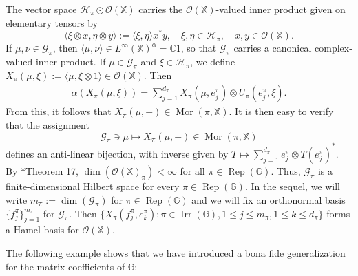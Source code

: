 \documentclass[reqno]{amsart}
\numberwithin{equation}{section}
\DeclareMathOperator{\Rep}{\mathrm{Rep}}
\DeclareMathOperator{\Irr}{\mathrm{Irr}}
\newcommand{\Mor}{\operatorname{Mor}}
\newcommand{\mcG}{\mathcal{G}}
\newcommand{\mcH}{\mathcal{H}}
\newcommand{\mcO}{\mathcal{O}}
\newcommand{\C}{\mathbb{C}}
\newcommand{\G}{\mathbb{G}}
\newcommand{\X}{\mathbb{X}}
\begin{document}
The vector space $\mcH_\pi \odot \mcO(\X)$ carries the $\mcO(\X)$-valued inner product given on elementary tensors by
$$\langle \xi \otimes x, \eta \otimes y\rangle := \langle \xi, \eta\rangle x^* y, \quad \xi, \eta \in \mcH_\pi, \quad x,y \in \mcO(\X).$$
If $\mu, \nu \in \mcG_\pi$, then $\langle \mu, \nu\rangle \in L^\infty(\X)^\alpha = \C1$, so that $\mcG_\pi$ carries a canonical complex-valued inner product. If $\mu \in \mcG_\pi$ and $\xi \in \mcH_\pi$, we define
$X_\pi(\mu, \xi):= \langle \mu, \xi \otimes 1\rangle \in \mcO(\X).$ Then
\begin{align}\label{actionmatrixcoeff}
    \alpha(X_\pi(\mu, \xi)) = \sum_{j=1}^{d_\pi} X_\pi(\mu, e_j^\pi)\otimes U_\pi(e_j^\pi, \xi).
\end{align}
From this, it follows that
$X_\pi(\mu, -)\in \Mor(\pi, \X)$.
It is then easy to verify that the assignment
$$\mcG_\pi \ni \mu\mapsto X_\pi(\mu,-)\in \Mor(\pi, \X)$$
defines an anti-linear bijection, with inverse given by $T \mapsto \sum_{j=1}^{d_\pi} e_j^\pi \otimes T(e_j^\pi)^*$. By \cite{Boc95}*{Theorem 17}, $\dim(\mcO(\X)_\pi)< \infty$ for all $\pi \in \Rep(\G)$. Thus, $\mcG_\pi$ is a finite-dimensional Hilbert space for every $\pi\in \Rep(\G)$. In the sequel, we will write $m_\pi:= \dim(\mcG_\pi)$ for $\pi\in \Rep(\G)$ and we will fix an orthonormal basis $\{f_j^\pi\}_{j=1}^{m_\pi}$ for $\mcG_\pi$. Then $\{X_\pi(f_j^\pi, e_k^\pi): \pi\in \Irr(\G), 1\le j \le m_\pi, 1 \le k\le  d_\pi\}$ forms a Hamel basis for $\mcO(\X)$.

The following example shows that we have introduced a bona fide generalization for the matrix coefficients of $\G$:
\end{document}

